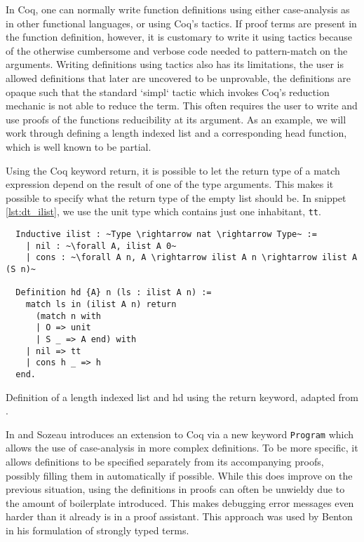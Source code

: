 \documentclass[a4, 12pt, final]{article}
\begin{document}
In Coq, one can normally write function definitions using either case-analysis as in other functional languages, or using Coq's tactics.
If proof terms are present in the function definition, however, it is customary to write it using tactics because of the otherwise cumbersome and verbose code needed to pattern-match on the arguments.
Writing definitions using tactics also has its limitations, the user is allowed definitions that later are uncovered to be unprovable, the definitions are opaque such that the standard `simpl` tactic which invokes Coq's reduction mechanic is not able to reduce the term.
This often requires the user to write and use proofs of the functions reducibility at its argument.
As an example, we will work through defining a length indexed list and a corresponding head function, which is well known to be partial.

Using the Coq keyword return, it is possible to let the return type of a match expression depend on the result of one of the type arguments.
This makes it possible to specify what the return type of the empty list should be.
In snippet \ref{lst:dt_ilist}, we use the unit type which contains just one inhabitant, \texttt{tt}.

\begin{listing}[h]
  \begin{verbatim}
  Inductive ilist : ~Type \rightarrow nat \rightarrow Type~ :=
    | nil : ~\forall A, ilist A 0~
    | cons : ~\forall A n, A \rightarrow ilist A n \rightarrow ilist A (S n)~

  Definition hd {A} n (ls : ilist A n) :=
    match ls in (ilist A n) return
      (match n with
      | O => unit
      | S _ => A end) with
    | nil => tt
    | cons h _ => h
  end.
  \end{verbatim}
  \caption{Definition of a length indexed list and hd using the return keyword, adapted from \cite{ChlipalaCPDT}.}
  \label{lst:dt_ilist}
\end{listing}

In \cite{Sozeau2006} and \cite{Sozeau2007} Sozeau introduces an extension to Coq via a new keyword \texttt{Program} which allows the use of case-analysis in more complex definitions.
To be more specific, it allows definitions to be specified separately from its accompanying proofs, possibly filling them in automatically if possible.
While this does improve on the previous situation, using the definitions in proofs can often be unwieldy due to the amount of boilerplate introduced.
This makes debugging error messages even harder than it already is in a proof assistant. This approach was used by Benton in his formulation of strongly typed terms.
\end{document}
